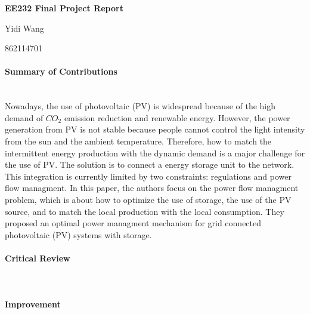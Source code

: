 \documentclass[11pt]{article}
\begin{document}
\centerline{\large \bf EE232 Final Project Report}
\centerline{Yidi Wang}
\centerline{862114701}

\vskip 0.1in


\paragraph{Summary of Contributions} \mbox{} \\
Nowadays, the use of photovoltaic (PV) is widespread because of the high demand of $CO_2$ emission reduction and renewable energy. However, the power generation from PV is not stable because people cannot control the light intensity from the sun and the ambient temperature. Therefore, how to match the intermittent energy production with the dynamic demand is a major challenge for the use of PV. The solution is to connect a energy storage unit to the network. This integration is currently limited by two constraints: regulations and power flow managment. In this paper, the authors focus on the power flow managment problem, which is about how to optimize the use of storage, the use of the PV source, and to match the local production with the local consumption. They proposed an optimal power managment mechanism for grid connected photovoltaic (PV) systems with storage. 



\paragraph{Critical Review} \mbox{} \\


\paragraph{Improvement} \mbox{} \\
\end{document}
